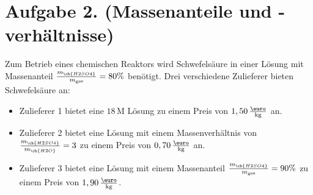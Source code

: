 \documentclass[german,12pt]{homework}
\newcommand{\sis}[1]{\,\si{#1}}
\begin{document}
    \section*{Aufgabe 2. (Massenanteile und -verhältnisse)}

    \begin{problem}
        Zum Betrieb eines chemischen Reaktors wird Schwefelsäure in einer
        Lösung mit Massenanteil \(\frac{m_{\ch{H2SO4}}}{m_\text{ges}} = 80\%\)
        benötigt. Drei verschiedene Zulieferer bieten Schwefelsäure an:
        \begin{itemize}
            \item Zulieferer 1 bietet eine \(18\sis{\mega}\) Lösung zu einem
            Preis von \(1,50\,\frac{\text{\euro}}{\si{\kilogram}}\) an.
            \item Zulieferer 2 bietet eine Lösung mit einem Massenverhältnis von
            \(\frac{m_{\ch{H2SO4}}}{m_{\ch{H2O}}} = 3\) zu einem Preis von
            \(0,70\,\frac{\text{\euro}}{\si{\kilogram}}\) an.
            \item Zulieferer 3 bietet eine Lösung mit einem Massenanteil
            \(\frac{m_{\ch{H2SO4}}}{m_\text{ges}} = 90\%\) zu einem Preis von
            \(1,90\,\frac{\text{\euro}}{\si{\kilogram}}\).
        \end{itemize}
    \end{problem}
\end{document}
